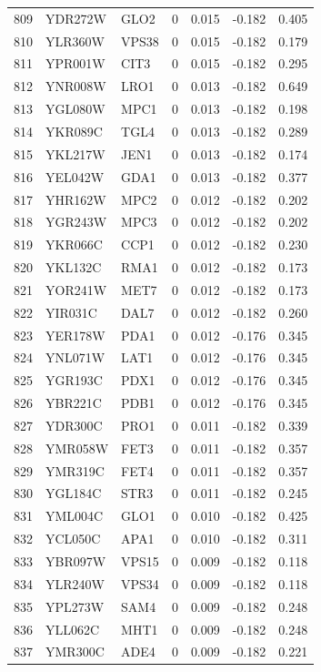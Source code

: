 \begin{longtable}{rllrrrr}
809 & YDR272W & GLO2 & 0 & 0.015 & -0.182 & 0.405\\
810 & YLR360W & VPS38 & 0 & 0.015 & -0.182 & 0.179\\
811 & YPR001W & CIT3 & 0 & 0.015 & -0.182 & 0.295\\
812 & YNR008W & LRO1 & 0 & 0.013 & -0.182 & 0.649\\
813 & YGL080W & MPC1 & 0 & 0.013 & -0.182 & 0.198\\
814 & YKR089C & TGL4 & 0 & 0.013 & -0.182 & 0.289\\
815 & YKL217W & JEN1 & 0 & 0.013 & -0.182 & 0.174\\
816 & YEL042W & GDA1 & 0 & 0.013 & -0.182 & 0.377\\
817 & YHR162W & MPC2 & 0 & 0.012 & -0.182 & 0.202\\
818 & YGR243W & MPC3 & 0 & 0.012 & -0.182 & 0.202\\
819 & YKR066C & CCP1 & 0 & 0.012 & -0.182 & 0.230\\
820 & YKL132C & RMA1 & 0 & 0.012 & -0.182 & 0.173\\
821 & YOR241W & MET7 & 0 & 0.012 & -0.182 & 0.173\\
822 & YIR031C & DAL7 & 0 & 0.012 & -0.182 & 0.260\\
823 & YER178W & PDA1 & 0 & 0.012 & -0.176 & 0.345\\
824 & YNL071W & LAT1 & 0 & 0.012 & -0.176 & 0.345\\
825 & YGR193C & PDX1 & 0 & 0.012 & -0.176 & 0.345\\
826 & YBR221C & PDB1 & 0 & 0.012 & -0.176 & 0.345\\
827 & YDR300C & PRO1 & 0 & 0.011 & -0.182 & 0.339\\
828 & YMR058W & FET3 & 0 & 0.011 & -0.182 & 0.357\\
829 & YMR319C & FET4 & 0 & 0.011 & -0.182 & 0.357\\
830 & YGL184C & STR3 & 0 & 0.011 & -0.182 & 0.245\\
831 & YML004C & GLO1 & 0 & 0.010 & -0.182 & 0.425\\
832 & YCL050C & APA1 & 0 & 0.010 & -0.182 & 0.311\\
833 & YBR097W & VPS15 & 0 & 0.009 & -0.182 & 0.118\\
834 & YLR240W & VPS34 & 0 & 0.009 & -0.182 & 0.118\\
835 & YPL273W & SAM4 & 0 & 0.009 & -0.182 & 0.248\\
836 & YLL062C & MHT1 & 0 & 0.009 & -0.182 & 0.248\\
837 & YMR300C & ADE4 & 0 & 0.009 & -0.182 & 0.221\\

\end{longtable}
